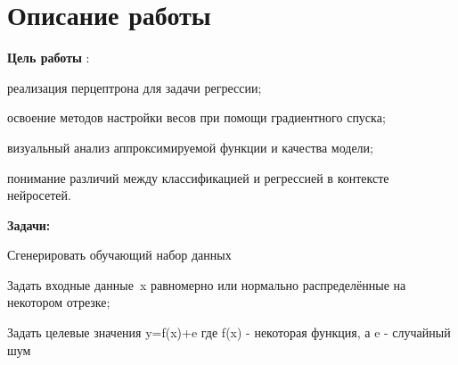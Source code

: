 \documentclass{article}%
\begin{document}
\section{Описание работы}%
\begin{flushleft}%
\textbf{Цель работы}%
: %
%
\end{flushleft}%
\begin{flushleft}%
реализация перцептрона для задачи регрессии;%
%
\end{flushleft}%
\begin{flushleft}%
освоение методов настройки весов при помощи градиентного спуска;%
%
\end{flushleft}%
\begin{flushleft}%
визуальный анализ аппроксимируемой функции и качества модели;%
%
\end{flushleft}%
\begin{flushleft}%
понимание различий между классификацией и регрессией в контексте нейросетей.%
%
\end{flushleft}%
\begin{flushleft}%
\textbf{Задачи:}%
%
\end{flushleft}%
\begin{flushleft}%
Сгенерировать обучающий набор данных %
%
\end{flushleft}%
\begin{flushleft}%
Задать входные данные x равномерно или нормально распределённые на некотором отрезке;%
%
\end{flushleft}%
\begin{flushleft}%
Задать целевые значения y=f(x)+e где f(x) - некоторая функция, а e - случайный шум%
%
\end{flushleft}%
\end{document}
